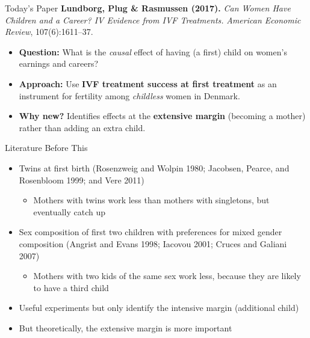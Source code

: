 \documentclass[11pt,notes=hide,aspectratio=169,mathserif]{beamer}
\begin{document}
\begin{frame}{Today's Paper}
\small
\textbf{Lundborg, Plug \& Rasmussen (2017).} \emph{Can Women Have Children and a Career? IV Evidence from IVF Treatments.} \textit{American Economic Review}, 107(6):1611–37. \\[0.6em]
\begin{itemize}
  \item \textbf{Question:} What is the \emph{causal} effect of having (a first) child on women’s earnings and careers?
  \item \textbf{Approach:} Use \textbf{IVF treatment success at first treatment} as an instrument for fertility among \emph{childless} women in Denmark.
  \item \textbf{Why new?} Identifies effects at the \textbf{extensive margin} (becoming a mother) rather than adding an extra child.
\end{itemize}
\end{frame}

\begin{frame}{Literature Before This}
\begin{itemize}
  \item Twins at first birth (Rosenzweig and Wolpin 1980; Jacobsen, Pearce, and Rosenbloom 1999; and Vere 2011)
  \begin{itemize}
    \item Mothers with twins work less than mothers with singletons, but eventually catch up
  \end{itemize}
  \item Sex composition of first two children with preferences for mixed gender composition (Angrist and Evans 1998; Iacovou 2001; Cruces and Galiani 2007)
  \begin{itemize}
    \item Mothers with two kids of the same sex work less, because they are likely to have a third child
  \end{itemize}
  \item Useful experiments but only identify the intensive margin (additional child)
  \item But theoretically, the extensive margin is more important
\end{itemize}
\end{frame}
\end{document}

